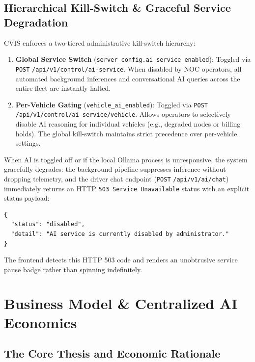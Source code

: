 \documentclass[12pt,a4paper]{report}
\begin{document}
\section{Hierarchical Kill-Switch \& Graceful Service Degradation}

CVIS enforces a two-tiered administrative kill-switch hierarchy:
\begin{enumerate}
  \item \textbf{Global Service Switch} (\texttt{server\_config.ai\_service\_enabled}): Toggled via \texttt{POST} \nolinkurl{/api/v1/control/ai-service}. When disabled by NOC operators, all automated background inferences and conversational AI queries across the entire fleet are instantly halted.
  \item \textbf{Per-Vehicle Gating} (\texttt{vehicle\_ai\_enabled}): Toggled via \texttt{POST} \nolinkurl{/api/v1/control/ai-service/vehicle}. Allows operators to selectively disable AI reasoning for individual vehicles (e.g., degraded nodes or billing holds). The global kill-switch maintains strict precedence over per-vehicle settings.
\end{enumerate}

When AI is toggled off or if the local Ollama process is unresponsive, the system gracefully degrades: the background pipeline suppresses inference without dropping telemetry, and the driver chat endpoint (\texttt{POST} \nolinkurl{/api/v1/ai/chat}) immediately returns an HTTP \texttt{503 Service Unavailable} status with an explicit status payload:
\begin{lstlisting}[caption=HTTP 503 AI Degradation Response]
{
  "status": "disabled",
  "detail": "AI service is currently disabled by administrator."
}
\end{lstlisting}
The frontend detects this HTTP 503 code and renders an unobtrusive service pause badge rather than spinning indefinitely.


\chapter{Business Model \& Centralized AI Economics}

\section{The Core Thesis and Economic Rationale}
\end{document}
